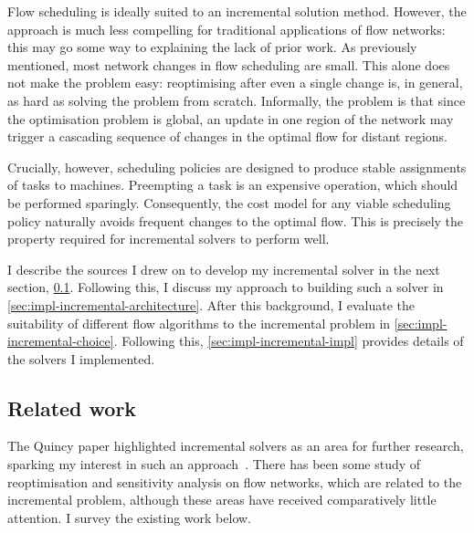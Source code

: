 Flow scheduling is ideally suited to an incremental solution method. However, the approach is much less compelling for traditional applications of flow networks: this may go some way to explaining the lack of prior work. As previously mentioned, most network changes in flow scheduling are small. This alone does not make the problem easy: reoptimising after even a single change is, in general, as hard as solving the problem from scratch\footnotemark. Informally, the problem is that since the optimisation problem is global, an update in one region of the network may trigger a cascading sequence of changes in the optimal flow for distant regions.

Crucially, however, scheduling policies are designed to produce stable assignments of tasks to machines. Preempting a task is an expensive operation, which should be performed sparingly. Consequently, the cost model for any viable scheduling policy naturally avoids frequent changes to the optimal flow. This is precisely the property required for incremental solvers to perform well.

I describe the sources I drew on to develop my incremental solver in the next section, \cref{sec:impl-incremental-related-work}. Following this, I discuss my approach to building such a solver in \cref{sec:impl-incremental-architecture}. After this background, I evaluate the suitability of different flow algorithms to the incremental problem in \cref{sec:impl-incremental-choice}. Following this, \cref{sec:impl-incremental-impl} provides details of the solvers I implemented.

\subsection{Related work} \label{sec:impl-incremental-related-work}
The Quincy paper highlighted incremental solvers as an area for further research, sparking my interest in such an approach~\cite[\S6.5]{Isard:2007}. There has been some study of reoptimisation and sensitivity analysis on flow networks, which are related to the incremental problem, although these areas have received comparatively little attention. I survey the existing work below.

